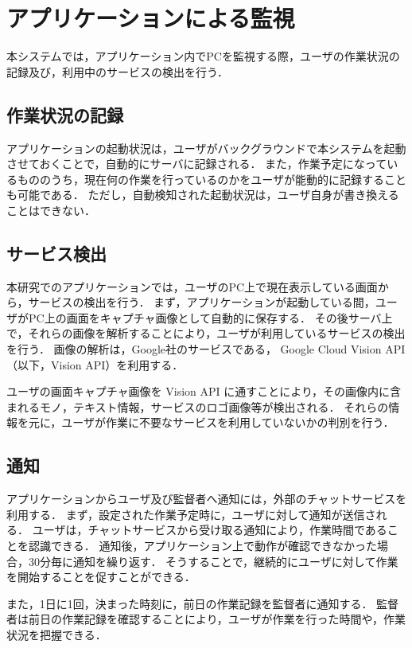 \section{アプリケーションによる監視}
本システムでは，アプリケーション内でPCを監視する際，ユーザの作業状況の記録及び，利用中のサービスの検出を行う．

\subsection{作業状況の記録}
アプリケーションの起動状況は，ユーザがバックグラウンドで本システムを起動させておくことで，自動的にサーバに記録される．
また，作業予定になっているもののうち，現在何の作業を行っているのかをユーザが能動的に記録することも可能である．
ただし，自動検知された起動状況は，ユーザ自身が書き換えることはできない．

\subsection{サービス検出}
本研究でのアプリケーションでは，ユーザのPC上で現在表示している画面から，サービスの検出を行う．
まず，アプリケーションが起動している間，ユーザがPC上の画面をキャプチャ画像として自動的に保存する．
その後サーバ上で，それらの画像を解析することにより，ユーザが利用しているサービスの検出を行う．
画像の解析は，Google社のサービスである， Google Cloud Vision API （以下，Vision API）を利用する．

ユーザの画面キャプチャ画像を Vision API に通すことにより，その画像内に含まれるモノ，テキスト情報，サービスのロゴ画像等が検出される．
それらの情報を元に，ユーザが作業に不要なサービスを利用していないかの判別を行う．


\subsection{通知}
アプリケーションからユーザ及び監督者へ通知には，外部のチャットサービスを利用する．
まず，設定された作業予定時に，ユーザに対して通知が送信される．
ユーザは，チャットサービスから受け取る通知により，作業時間であることを認識できる．
通知後，アプリケーション上で動作が確認できなかった場合，30分毎に通知を繰り返す．
そうすることで，継続的にユーザに対して作業を開始することを促すことができる．

また，1日に1回，決まった時刻に，前日の作業記録を監督者に通知する．
監督者は前日の作業記録を確認することにより，ユーザが作業を行った時間や，作業状況を把握できる．

\clearpage

